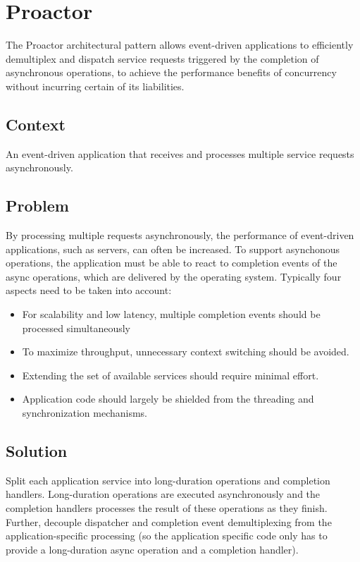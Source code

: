 \section{Proactor}
\label{sec:proactor}

The Proactor architectural pattern allows event-driven applications to efficiently demultiplex and dispatch service requests triggered by the completion of asynchronous operations, to achieve the performance benefits of concurrency without incurring certain of its liabilities.


\subsection{Context}

An event-driven application that receives and processes multiple service requests asynchronously.


\subsection{Problem}

By processing multiple requests asynchronously, the performance of event-driven applications, such as servers, can often be increased. To support asynchonous operations, the application must be able to react to completion events of the async operations, which are delivered by the operating system. Typically four aspects need to be taken into account:

\begin{itemize}
	\item For scalability and low latency, multiple completion events should be processed simultaneously
	\item To maximize throughput, unnecessary context switching should be avoided.
	\item Extending the set of available services should require minimal effort.
	\item Application code should largely be shielded from the threading and synchronization mechanisms.
\end{itemize}


\subsection{Solution}

Split each application service into long-duration operations and completion handlers. Long-duration operations are executed asynchronously and the completion handlers processes the result of these operations as they finish. Further, decouple dispatcher and completion event demultiplexing from the application-specific processing (so the application specific code only has to provide a long-duration async operation and a completion handler).


